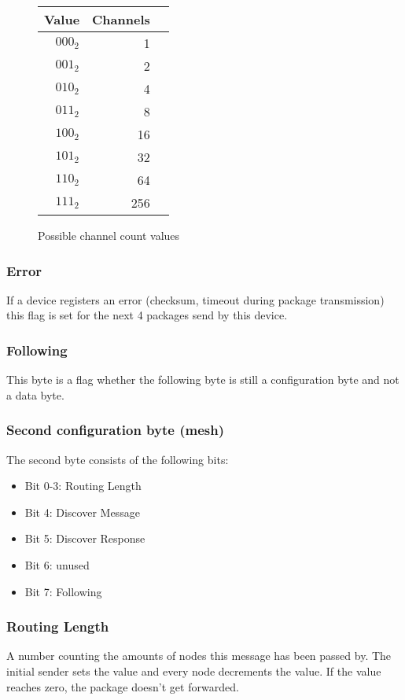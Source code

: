 \documentclass{scrreprt}
\begin{document}
\begin{figure}[H]
   \centering
   \begin{tabular}{rrr}
     \toprule
     Value & Channels \\
     \midrule
     $000_2$ & 1 \\
     $001_2$ & 2 \\
     $010_2$ & 4 \\
     $011_2$ & 8 \\
     $100_2$ & 16 \\
     $101_2$ & 32 \\
     $110_2$ & 64 \\
     $111_2$ & 256 \\
     \bottomrule
   \end{tabular}
   \caption{Possible channel count values}
   \label{fig:channelValues}
\end{figure}

\subsubsection{Error}
If a device registers an error (checksum, timeout during package
transmission) this flag is set for the next 4 packages send by this device.

\subsubsection{Following}
This byte is a flag whether the following byte is still a configuration
byte and not a data byte.

\subsubsection{Second configuration byte (mesh)}
The second byte consists of the following bits:
\begin{itemize}
  \item Bit 0-3: Routing Length
  \item Bit 4: Discover Message
  \item Bit 5: Discover Response
  \item Bit 6: unused
  \item Bit 7: Following
\end{itemize}

\subsubsection{Routing Length}
A number counting the amounts of nodes this message has been passed by. The
initial sender sets the value and every node decrements the value. If the
value reaches zero, the package doesn't get forwarded.
\end{document}
